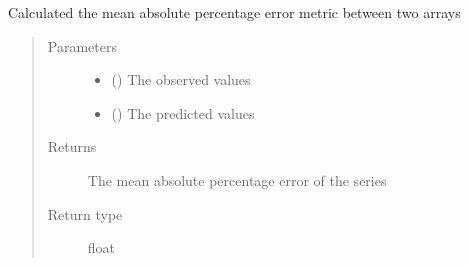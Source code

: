 \documentclass[letterpaper,10pt,english]{sphinxmanual}
\begin{document}
\begin{fulllineitems}
\label{\detokenize{index:Src.utils.mean_absolute_percentage_error}}
Calculated the mean absolute percentage error metric
between two arrays
\begin{quote}\begin{description}
\item[{Parameters}] \leavevmode\begin{itemize}
\item {} 
 () \textendash{} The observed values

\item {} 
 () \textendash{} The predicted values

\end{itemize}

\item[{Returns}] \leavevmode
The mean absolute percentage error of the series

\item[{Return type}] \leavevmode
float

\end{description}\end{quote}

\end{fulllineitems}

\end{document}
